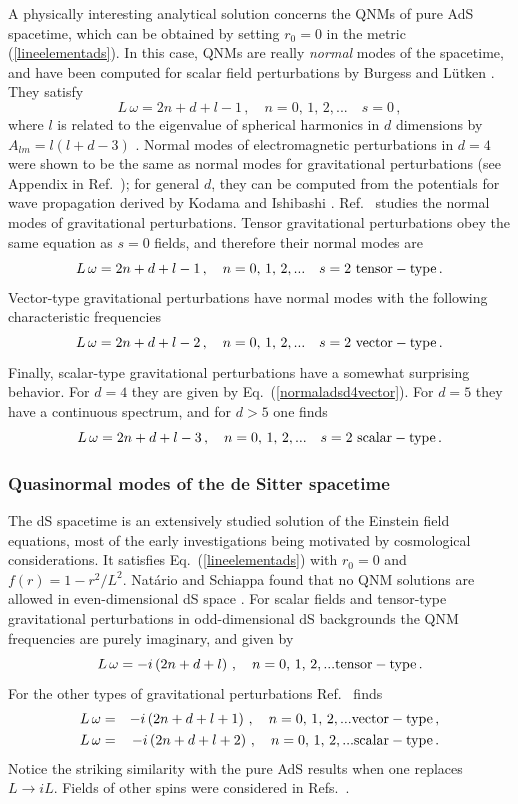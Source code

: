 \documentclass[]{iopart}
\def\be{\begin{equation}}
\def\ee{\end{equation}}
\def\beq{\begin{eqnarray}}
\def\eeq{\end{eqnarray}}
\begin{document}
A physically interesting analytical solution concerns the QNMs of pure AdS
spacetime, which can be obtained by setting $r_0=0$ in the metric
(\ref{lineelementads}). In this case, QNMs are really {\em normal} modes of
the spacetime, and have been computed for scalar field perturbations by
Burgess and L\"{u}tken \cite{Burgess:1984ti}. They satisfy
%
\be L\,\omega=2n+d+l-1\,,\quad n=0,\,1,\,2,...\quad
s=0\,,\ee
%
where $l$ is related to the eigenvalue of spherical harmonics in $d$
dimensions by $A_{lm}=l(l+d-3)$ \cite{Berti:2005gp}. Normal modes of
electromagnetic perturbations in $d=4$ were shown to be the same as normal
modes for gravitational perturbations (see Appendix in
Ref.~\cite{Cardoso:2003cj}); for general $d$, they can be computed from the
potentials for wave propagation derived by Kodama and Ishibashi
\cite{Kodama:2003kk}. Ref.~\cite{Natario:2004jd} studies the normal modes of
gravitational perturbations.  Tensor gravitational perturbations obey the same
equation as $s=0$ fields, and therefore their normal modes are
%
\be L\,\omega=2n+d+l-1\,,\quad n=0,\,1,\,2,...\quad
s=2\,\,{\rm tensor-type}\,.\ee
%
Vector-type gravitational perturbations have normal modes with the following
characteristic frequencies
%
\be L\,\omega=2n+d+l-2\,,\quad n=0,\,1,\,2,...\quad s=2 \,\,
{\rm vector-type}\,.\label{normaladsd4vector}\ee
%
Finally, scalar-type gravitational perturbations have a somewhat surprising
behavior. For $d=4$ they are given by Eq.~(\ref{normaladsd4vector}). For $d=5$
they have a continuous spectrum, and for $d>5$ one finds \cite{Natario:2004jd}
%
\be L\,\omega=2n+d+l-3\,,\quad n=0,\,1,\,2,...\quad
s=2\,\,{\rm scalar-type}\,.\ee
%

\subsubsection*{Quasinormal modes of the de Sitter spacetime}

The dS spacetime is an extensively studied solution of the Einstein field
equations, most of the early investigations being motivated by cosmological
considerations. It satisfies Eq.~(\ref{lineelementads}) with $r_0=0$ and $f(r)
= 1 - r^2/L^2$.  Nat\'ario and Schiappa found that no QNM solutions are
allowed in even-dimensional dS space \cite{Natario:2004jd}. For scalar fields
and tensor-type gravitational perturbations in odd-dimensional dS backgrounds
the QNM frequencies are purely imaginary, and given by
%
\be L\,\omega=-i\left (2n+d+l\right )\,,\quad
n=0,\,1,\,2,...{\rm tensor-type}\,.\ee
%
For the other types of gravitational perturbations Ref.~\cite{Natario:2004jd}
finds
%
\beq 
L\,\omega&=&-i\left (2n+d+l+1\right )\,,\quad
n=0,\,1,\,2,...{\rm vector-type}\,,\\
L\,\omega&=&-i\left (2n+d+l+2\right )\,,\quad
n=0,\,1,\,2,...{\rm scalar-type}\,.
\eeq
%
Notice the striking similarity with the pure AdS results when one replaces
$L\rightarrow iL$. Fields of other spins were considered in
Refs.~\cite{LopezOrtega:2006my,LopezOrtega:2007sr}.
\end{document}
